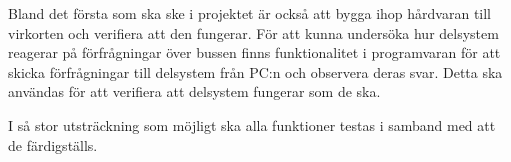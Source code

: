 Bland det första som ska ske i projektet är också att bygga ihop hårdvaran till virkorten och verifiera att den fungerar.                                                                                                                
För att kunna undersöka hur delsystem reagerar på förfrågningar över bussen finns funktionalitet i programvaran för att skicka förfrågningar till delsystem från PC:n och observera deras svar. Detta ska användas för att verifiera att delsystem fungerar som de ska.

I så stor utsträckning som möjligt ska alla funktioner testas i samband med att de färdigställs.


